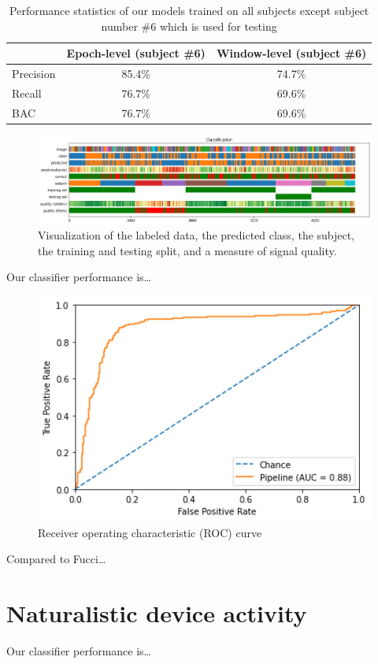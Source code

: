         \begin{table}
            \begin{center}
                \begin{tabular}{ l | c | c }
                  \toprule
                  & Epoch-level (subject \#6) & Window-level (subject \#6) \\ \midrule
                  Precision & 85.4\% & 74.7\% \\
                  Recall & 76.7\% & 69.6\% \\
                  BAC & 76.7\% & 69.6\% \\
                  \bottomrule
                  
                \end{tabular}
                \caption{Performance statistics of our models trained on all subjects except subject number \#6 which is used for testing}\label{fig:stats}
            \end{center}
        \end{table}

        \begin{figure}
        \centering
        \includegraphics[width=24cm]{img/timebars.png}
        \caption{Visualization of the labeled data, the predicted class, the subject, the training and testing split, and a measure of signal quality.}\label{fig:timebars}
        \end{figure}

        Our classifier performance is\ldots

        \begin{figure}[h]
        \centering
        \includegraphics[width=12cm]{img/roccurve.png}
        \caption{Receiver operating characteristic (ROC) curve}\label{fig:roc}
        \end{figure}


        Compared to Fucci\ldots

    \section{Naturalistic device activity}

        Our classifier performance is\ldots

